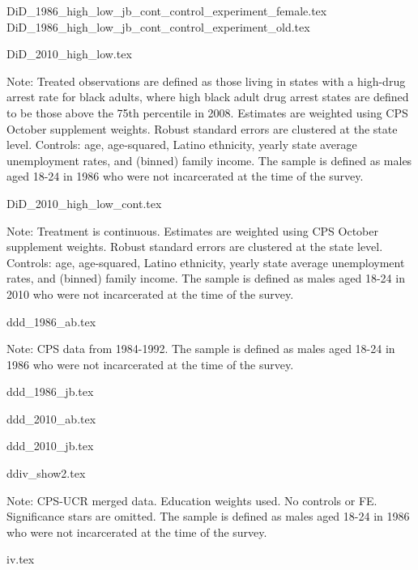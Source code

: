 {DiD_1986_high_low_jb_cont_control_experiment_female.tex}
{DiD_1986_high_low_jb_cont_control_experiment_old.tex}

\clearpage

{DiD_2010_high_low.tex}
\begin{footnotesize}
  \noindent Note: Treated observations are defined as those living in states with a high-drug arrest rate for black adults, where high black adult drug arrest states are defined to be those above the 75th percentile in 2008. Estimates are weighted using CPS October supplement weights. Robust standard errors are clustered at the state level. Controls: age, age-squared, Latino ethnicity, yearly state average unemployment rates, and (binned) family income. The sample is defined as males aged 18-24 in 1986 who were not incarcerated at the time of the survey.
\end{footnotesize}

{DiD_2010_high_low_cont.tex}
\begin{footnotesize}
  \noindent Note: Treatment is continuous. Estimates are weighted using CPS October supplement weights. Robust standard errors are clustered at the state level. Controls: age, age-squared, Latino ethnicity, yearly state average unemployment rates, and (binned) family income. The sample is defined as males aged 18-24 in 2010 who were not incarcerated at the time of the survey.
\end{footnotesize}
\clearpage

{ddd_1986_ab.tex}
\begin{footnotesize}
  \noindent Note: CPS data from 1984-1992.
  The sample is defined as males aged 18-24 in 1986 who were not incarcerated at the time of the survey.
\end{footnotesize}

\clearpage

{ddd_1986_jb.tex}

\clearpage

{ddd_2010_ab.tex}

\clearpage

{ddd_2010_jb.tex}
\clearpage 

{ddiv_show2.tex}
\begin{footnotesize}
  \noindent Note: CPS-UCR merged data. Education weights used. No controls or FE. Significance stars are omitted.
  The sample is defined as males aged 18-24 in 1986 who were not incarcerated at the time of the survey. 
\end{footnotesize}

\clearpage

{iv.tex}

